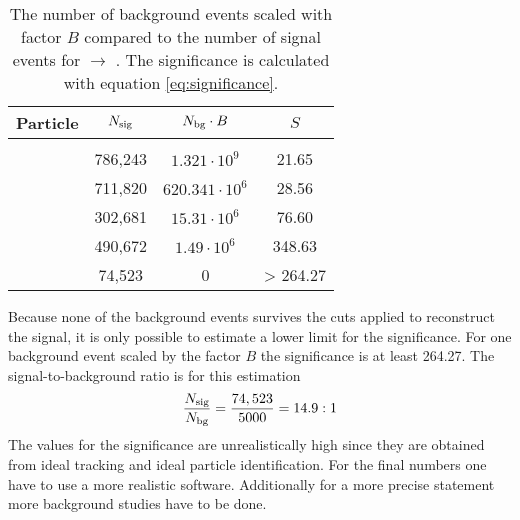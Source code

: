 \begin{table}
	\centering
	\caption{\propose The number of background events scaled with factor $B$ compared to the number of signal events for \pbarpSystem $\rightarrow$ \excitedcascade \anticascade.
		The significance is calculated with equation \ref{eq:significance}.}
	\label{bg_compared_reco_with_scaling}
	\begin{tabular}{lccc}
		\hline
		Particle & $N_{\textnormal{sig}}$ & $N_{\textnormal{bg}} \cdot B$ & $S$\\
		\hline
		\hline
		& & &\\
		\lam & 786,243 &$ 1.321 \cdot 10^{9}$& 21.65\\
		\alam & 711,820 & $620.341 \cdot 10^{6}$ & 28.56\\
		\anticascade & 302,681 & $15.31 \cdot 10^{6}$ & 76.60\\
		\excitedcascade &490,672  & $1.49 \cdot 10^{6}$& 348.63\\
		\excitedcascade \anticascade &  74,523 & 0 & > 264.27\\
		\hline
		 
		  
	\end{tabular}
\end{table}
Because none of the background events survives the cuts applied to reconstruct the signal, it is only possible to estimate a lower limit for the significance.
For one background event scaled by the factor $B$ the significance is at least 264.27.
The signal-to-background ratio is for this estimation
\begin{equation}
	\nonumber
	\frac{N_{\textnormal{sig}}}{N_{\textnormal{bg}}} = \frac{74,523} {5000} = 14.9 : 1
\end{equation}
The values for the significance are unrealistically high since they are obtained from ideal tracking and ideal particle identification.
For the final numbers one have to use a more realistic software.
Additionally for a more precise statement more background studies have to be done.
 
	